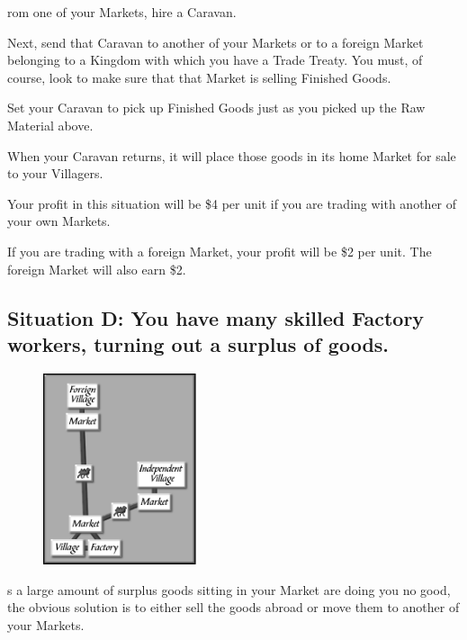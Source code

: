 rom one of your Markets, hire a Caravan.

Next, send that Caravan to another of your Markets or to a foreign Market belonging to a Kingdom with which you have a Trade Treaty. You must, of course, look to make sure that that Market is selling Finished Goods.

Set your Caravan to pick up Finished Goods just as you picked up the Raw Material above.

When your Caravan returns, it will place those goods in its home Market for sale to your Villagers.

Your profit in this situation will be \$4 per unit if you are trading with another of your own Markets.

If you are trading with a foreign Market, your profit will be \$2 per unit. The foreign Market will also earn \$2.

\clearpage

\subsection{Situation D: You have many skilled Factory workers, turning out a surplus of goods.}

\begin{figure}
	\vspace{-20pt}
	\begin{center}
		\includegraphics[width=0.4\textwidth]{Itradesit4}
	\end{center}
	\vspace{-20pt}
\end{figure}

s a large amount of surplus goods sitting in your Market are doing you no good, the obvious solution is to either sell the goods abroad or move them to another of your Markets.

